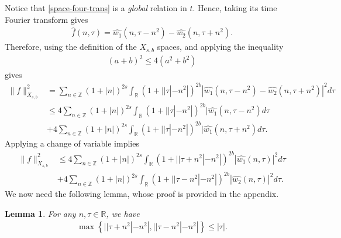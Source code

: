 \documentclass[12pt,reqno]{amsart}
\numberwithin{equation}{section}  %
\numberwithin{figure}{section}
\newcommand{\rr}{\mathbb{R}}
\newcommand{\zz}{\mathbb{Z}}
\newcommand{\wh}{\widehat}
\theoremstyle{plain}
\newtheorem{lemma}{Lemma}
\theoremstyle{definition}
\theoremstyle{remark}
\begin{document}
%
%
%
Notice that \eqref{space-four-trans} is a \emph{global} relation in $t$.
Hence, taking its time Fourier transform gives
%
%
\begin{equation}
  \label{full-fourier-trans-exp}
\begin{split}
  \wh{f}(n, \tau) = \wh{w_{1}}(n, \tau - n^{2}) - \wh{w_{2}}(n, \tau +
  n^{2}).
\end{split}
\end{equation}
%
%
Therefore, using the definition of the $X_{s,b}$ spaces, and applying the
inequality 
%
%
\begin{equation*}
\begin{split}
  (a + b)^{2} \le 4(a^{2} + b^{2})
\end{split}
\end{equation*}
%
%
gives 
%
%
\begin{equation*}
\begin{split}
  \| f \|_{X_{s,b}}^{2}
  & = \sum_{n \in \zz} (1 + |n|)^{2s} \int_{\rr} (1 + |
  | \tau | - n^{2} |)^{2b} | \wh{w_{1}}(n, \tau - n^{2}) - \wh{w_{2}}(n, \tau +
  n^{2}) |^{2} d \tau
  \\
  & \le 4 \sum_{n \in \zz} (1 + |n|)^{2s} \int_{\rr} (1 + |
  | \tau | - n^{2} |)^{2b} | \wh{w_{1}}(n, \tau - n^{2}) d \tau
  \\
  & + 4 \sum_{n \in \zz} (1 + |n|)^{2s} \int_{\rr} (1 + |
  | \tau | - n^{2} |)^{2b} | \wh{w_{1}}(n, \tau + n^{2}) d \tau.
\end{split}
\end{equation*}
%
%
Applying a change of variable implies
%
%
%
%
\begin{equation}
\begin{split}
  \| f \|_{X_{s,b}}^{2}
  & \le 4 \sum_{n \in \zz} (1 + |n|)^{2s} \int_{\rr} (1 + |
  | \tau + n^{2} | - n^{2} |)^{2b} | \wh{w_{1}}(n, \tau) |^2 d \tau
  \\
  & + 4 \sum_{n \in \zz} (1 + |n|)^{2s} \int_{\rr} (1 + |
  | \tau - n^{2} | - n^{2} |)^{2b} | \wh{w_{2}}(n, \tau )|^2 d \tau.
\end{split}
\label{comp-pre-lemma}
\end{equation}
%
%
We now need the following lemma, whose proof is provided in the appendix.
%
%
%
%
%
%
%
%
\begin{lemma}
For any $n, \tau \in \rr$, we have
\label{lem:mod-princ-symb-bound}
%
%
\begin{equation*}
\begin{split}
  \max\left\{ | | \tau + n^{2} | - n^{2} |, | | \tau - n^{2} | - n^{2} |
  \right\} \le | \tau |.
\end{split}
\end{equation*}
%
%
\end{lemma}
\end{document}
